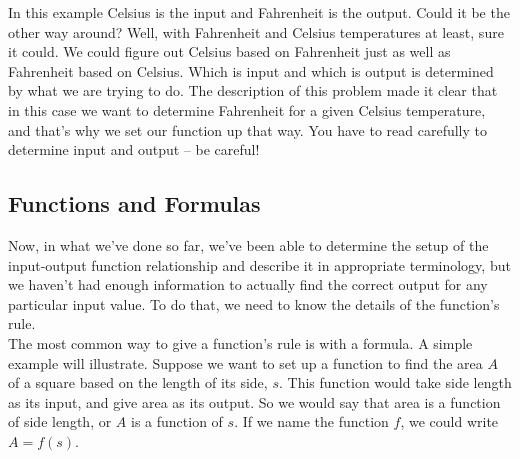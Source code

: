 
In this example Celsius is the input and Fahrenheit is the output. Could it be the other way around? Well, with Fahrenheit and Celsius temperatures at least, sure it could. We could figure out Celsius based on Fahrenheit just as well as Fahrenheit based on Celsius. Which is input and which is output is determined by what we are trying to do. The description of this problem made it clear that in this case we want to determine Fahrenheit for a given Celsius temperature, and that’s why we set our function up that way. You have to read carefully to determine input and output – be careful!

%
%

\subsection{Functions and Formulas}

Now, in what we've done so far, we've been able to determine the setup of the input-output function relationship and describe it in appropriate terminology, but we haven't had enough information to actually find the correct output for any particular input value. To do that, we need to know the details of the function's rule.\\

The most common way to give a function's rule is with a formula. A simple example will illustrate. Suppose we want to set up a function to find the area $A$ of a square based on the length of its side, $s$. This function would take side length as its input, and give area as its output. So we would say that area is a function of side length, or $A$ is a function of $s$. If we name the function $f$, we could write $A = f(s)$.\\

